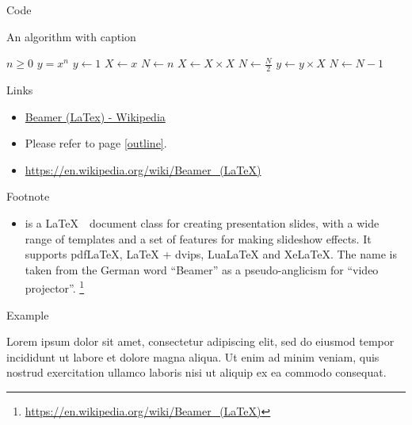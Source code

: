 \documentclass{beamer}
\begin{document}
\begin{frame}{Code}
    \begin{algorithm}[H]
        \caption{An algorithm with caption}
        \begin{algorithmic}
            \Require $n \geq 0$
            \Ensure $y = x^n$
            \State $y \gets 1$
            \State $X \gets x$
            \State $N \gets n$
                \State $X \gets X \times X$
                \State $N \gets \frac{N}{2}$  
                \State $y \gets y \times X$
                \State $N \gets N - 1$
            \EndIf
            \EndWhile
        \end{algorithmic}
    \end{algorithm}
\end{frame}

\begin{frame}{Links}
    \begin{itemize}
        \item \href{https://en.wikipedia.org/wiki/Beamer_(LaTeX)}{Beamer (LaTex) - Wikipedia}
        \item Please refer to page \ref{outline}.
        \item \url{https://en.wikipedia.org/wiki/Beamer_(LaTeX)}
    \end{itemize}
\end{frame}

\begin{frame}{Footnote}
    \begin{itemize}
        \item {} is a \LaTeX~~document class for creating presentation slides, with a wide range of templates and a set of features for making slideshow effects. It supports pdfLaTeX, LaTeX + dvips, LuaLaTeX and XeLaTeX. The name is taken from the German word ``Beamer'' as a pseudo-anglicism for ``video projector''. \footnote{\href{https://en.wikipedia.org/wiki/Beamer_(LaTeX)}{https://en.wikipedia.org/wiki/Beamer\_(LaTeX)}}
    \end{itemize}
\end{frame}


\begin{frame}{Example}
    \begin{example}
        Lorem ipsum dolor sit amet, consectetur adipiscing elit, sed do eiusmod tempor incididunt ut labore et dolore magna aliqua. Ut enim ad minim veniam, quis nostrud exercitation ullamco laboris nisi ut aliquip ex ea commodo consequat.
    \end{example}
\end{frame}
\end{document}
